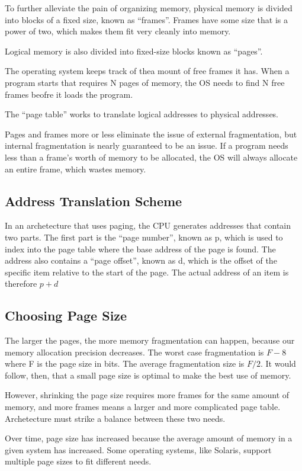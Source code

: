 \documentclass{article}
\begin{document}
To further alleviate the pain of organizing memory, physical memory is divided
into blocks of a fixed size, known as ``frames''. Frames have some size that is
a power of two, which makes them fit very cleanly into memory.

Logical memory is also divided into fixed-size blocks known as ``pages''.

The operating system keeps track of thea mount of free frames it has. When a
program starts that requires N pages of memory, the OS needs to find N free
frames beofre it loads the program.

The ``page table'' works to translate logical addresses to physical addresses.

Pages and frames more or less eliminate the issue of external fragmentation,
but internal fragmentation is nearly guaranteed to be an issue. If a program
needs less than a frame's worth of memory to be allocated, the OS will always
allocate an entire frame, which wastes memory.

\subsection{Address Translation Scheme}
In an archetecture that uses paging, the CPU generates addresses that contain
two parts. The first part is the ``page number'', known as p, which is used
to index into the page table where the base address of the page is found. The
address also contains a ``page offset'', known as d, which is the offset of the
specific item relative to the start of the page. The actual address of an item
is therefore $p+d$

\subsection{Choosing Page Size}
The larger the pages, the more memory fragmentation can happen, because our
memory allocation precision decreases. The worst case fragmentation is $F-8$
where F is the page size in bits. The average fragmentation size is $F/2$.
It would follow, then, that a small page size is optimal to make the best use
of memory.

However, shrinking the page size requires more frames for the same amount of
memory, and more frames means a larger and more complicated page table.
Archetecture must strike a balance between these two needs.

Over time, page size has increased because the average amount of memory in a
given system has increased. Some operating systems, like Solaris, support
multiple page sizes to fit different needs.
\end{document}
